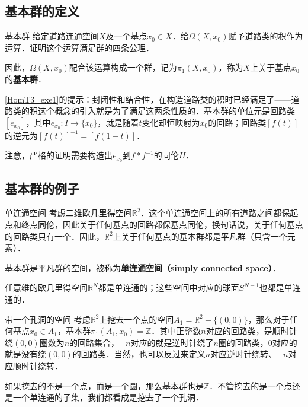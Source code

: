 \subsection{基本群的定义}

\begin{exercise}{基本群}\label{HomT3_exe1}
给定道路连通空间$X$及一个基点$x_0\in X$．给$\Omega(X, x_0)$赋予道路类的积作为运算．证明这个运算满足群的四条公理．

因此，$\Omega(X, x_0)$配合该运算构成一个群，记为$\pi_1(X, x_0)$，称为$X$上关于基点$x_0$的\textbf{基本群}．
\end{exercise}

\autoref{HomT3_exe1}的提示：封闭性和结合性，在构造道路类的积时已经满足了——道路类的积这个概念的引入就是为了满足这两条性质的．基本群的单位元是回路类$[e_{x_0}]$，其中$e_{x_0}: I\rightarrow\{x_0\}$，就是随着$t$变化却恒映射为$x_0$的回路；回路类$[f(t)]$的逆元为$[f(t)]^{-1}=[f(1-t)]$．

注意，严格的证明需要构造出$e_{x_0}$到$f*f^{-1}$的同伦$H$．

\subsection{基本群的例子}

\begin{example}{单连通空间}
考虑二维欧几里得空间$\mathbb{R}^2$．这个单连通空间上的所有道路之间都保起点和终点同伦，因此关于任何基点的回路都保基点同伦，换句话说，关于任何基点的回路类只有一个．因此，$\mathbb{R}^2$上关于任何基点的基本群都是平凡群（只含一个元素）．

基本群是平凡群的空间，被称为\textbf{单连通空间（simply connected space）}．

任意维的欧几里得空间$\mathbb{R}^N$都是单连通的；这些空间中对应的球面$S^{N-1}$也都是单连通的．
\end{example}

\begin{example}{带一个孔洞的空间}
考虑$\mathbb{R}^2$上挖去一个点的空间$A_1=\mathbb{R}^2-\{(0,0)\}$，那么对于任何基点$x_0\in A_1$，基本群$\pi_1(A_1, x_0)=\mathbb{Z}$．其中正整数$n$对应的回路类，是顺时针绕$(0,0)$圈数为$n$的回路集合，$-n$对应的就是逆时针绕了$n$圈的回路类，$0$对应的就是没有绕$(0,0)$的回路类．当然，也可以反过来定义$n$对应逆时针绕转、$-n$对应顺时针绕转．

如果挖去的不是一个点，而是一个圆，那么基本群也是$\mathbb{Z}$．不管挖去的是一个点还是一个单连通的子集，我们都看成是挖去了一个孔洞．
\end{example}

